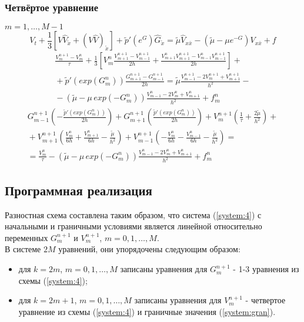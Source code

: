 \subsubsection*{Четвёртое уравнение}
$m = 1,\dots, M-1$
\begin{equation*}
  V_t + \frac13 [V \hat V_{\mathring{x}} + (V \hat V)_{\mathring{x}} ] + 
    \tilde{p}'(e^G) \hat G_{\mathring{x}} =
    \tilde{\mu} \hat V_{x \bar x} - 
    (\tilde{\mu} - \mu e^{-G}) V_{x \bar x} + f
\end{equation*}
\begin{multline*}
  \frac{V_{m}^{n+1} - V_{m}^{n}}{\tau} + \frac13 \left[
    V_{m}^{n} \frac{V_{m+1}^{n+1} - V_{m-1}^{n+1}}{2h} +
    \frac{V_{m+1}^{n} V_{m+1}^{n+1} - V_{m-1}^{n} V_{m-1}^{n+1}}{2h} 
    \right] +{} \\ {}+
  \tilde{p}'(exp(G_{m}^{n})) \frac{G_{m+1}^{n+1} - G_{m-1}^{n+1}}{2h} =
  \tilde{\mu} \frac{V_{m-1}^{n+1} - 2 V_{m}^{n+1} + V_{m+1}^{n+1}}{h^2}
  -{} \\ {}-
  (\tilde{\mu} - \mu\,exp(-G_{m}^{n}))
    \frac{V_{m-1}^{n} - 2 V_{m}^{n} + V_{m+1}^{n}}{h^2} + f_{m}^{n}
\end{multline*}
\begin{multline*}
  G_{m-1}^{n+1} \left(-\frac{\tilde{p}'(exp(G_{m}^{n}))}{2h} \right) +
  G_{m+1}^{n+1} \left( \frac{\tilde{p}'(exp(G_{m}^{n}))}{2h} \right) +
  V_{m}^{n+1} \left( \frac{1}{\tau} + \frac{2\tilde{\mu}}{h^2} \right)
  +{} \\ {}+
  V_{m+1}^{n+1} \left( 
    \frac{V_{m}^{n}}{6h} + \frac{V_{m+1}^{n}}{6h} - \frac{\tilde{\mu}}{h^2} \right) +
  V_{m-1}^{n+1} \left( 
    -\frac{V_{m}^{n}}{6h} - \frac{V_{m-1}^{n}}{6h} - \frac{\tilde{\mu}}{h^2} \right)
  = \\ =
  \frac{V_{m}^{n}}{\tau} -
  (\tilde{\mu} - \mu\,exp(-G_{m}^{n}))
    \frac{V_{m-1}^{n} - 2 V_{m}^{n} + V_{m+1}^{n}}{h^2} + f_{m}^{n}
\end{multline*}



\subsection{Программная реализация}
Разностная схема составлена таким образом, что система (\ref{system:4}) с начальными и граничными условиями является линейной относительно переменных $G_{m}^{n+1}$ и $V_{m}^{n+1}$, $m=0,1, \dots ,M$. \\

В системе $2M$ уравнений, они упорядочены следующим образом: 
\begin{itemize}
  \item для $k=2m$, $m=0,1, \dots ,M$ записаны уравнения для $G_{m}^{n+1}$ - 1-3 уравнения из схемы (\ref{system:4});
  \item для $k=2m+1$, $m=0,1, \dots ,M$ записаны уравнения для $V_{m}^{n+1}$ - четвертое уравнение из схемы (\ref{system:4}) и граничные значения (\ref{system:gran}). 
\end{itemize}

